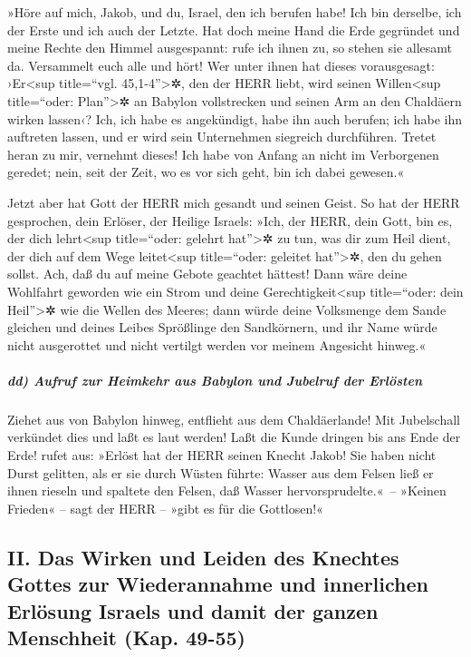 »Höre auf mich, Jakob, und du, Israel, den ich berufen
habe! Ich bin derselbe, ich der Erste und ich auch der Letzte.
Hat doch meine Hand die Erde gegründet und meine Rechte
den Himmel ausgespannt: rufe ich ihnen zu, so stehen sie allesamt da.
Versammelt euch alle und hört! Wer unter ihnen hat dieses
vorausgesagt: ›Er\textless sup title=``vgl. 45,1-4''\textgreater✲, den
der HERR liebt, wird seinen Willen\textless sup title=``oder:
Plan''\textgreater✲ an Babylon vollstrecken und seinen Arm an den
Chaldäern wirken lassen‹? Ich, ich habe es angekündigt,
habe ihn auch berufen; ich habe ihn auftreten lassen, und er wird sein
Unternehmen siegreich durchführen. Tretet heran zu mir,
vernehmt dieses! Ich habe von Anfang an nicht im Verborgenen geredet;
nein, seit der Zeit, wo es vor sich geht, bin ich dabei gewesen.«

Jetzt aber hat Gott der HERR mich gesandt und seinen Geist.
So hat der HERR gesprochen, dein Erlöser, der Heilige
Israels: »Ich, der HERR, dein Gott, bin es, der dich lehrt\textless sup
title=``oder: gelehrt hat''\textgreater✲ zu tun, was dir zum Heil dient,
der dich auf dem Wege leitet\textless sup title=``oder: geleitet
hat''\textgreater✲, den du gehen sollst. Ach, daß du auf
meine Gebote geachtet hättest! Dann wäre deine Wohlfahrt geworden wie
ein Strom und deine Gerechtigkeit\textless sup title=``oder: dein
Heil''\textgreater✲ wie die Wellen des Meeres; dann würde
deine Volksmenge dem Sande gleichen und deines Leibes Sprößlinge den
Sandkörnern, und ihr Name würde nicht ausgerottet und nicht vertilgt
werden vor meinem Angesicht hinweg.«

\hypertarget{dd-aufruf-zur-heimkehr-aus-babylon-und-jubelruf-der-erluxf6sten}{%
\subparagraph{dd) Aufruf zur Heimkehr aus Babylon und Jubelruf der
Erlösten}\label{dd-aufruf-zur-heimkehr-aus-babylon-und-jubelruf-der-erluxf6sten}}

Ziehet aus von Babylon hinweg, entflieht aus dem
Chaldäerlande! Mit Jubelschall verkündet dies und laßt es laut werden!
Laßt die Kunde dringen bis ans Ende der Erde! rufet aus: »Erlöst hat der
HERR seinen Knecht Jakob! Sie haben nicht Durst gelitten,
als er sie durch Wüsten führte: Wasser aus dem Felsen ließ er ihnen
rieseln und spaltete den Felsen, daß Wasser hervorsprudelte.«~--
»Keinen Frieden« -- sagt der HERR -- »gibt es für die
Gottlosen!«

\hypertarget{ii.-das-wirken-und-leiden-des-knechtes-gottes-zur-wiederannahme-und-innerlichen-erluxf6sung-israels-und-damit-der-ganzen-menschheit-kap.-49-55}{%
\subsection{II. Das Wirken und Leiden des Knechtes Gottes zur
Wiederannahme und innerlichen Erlösung Israels und damit der ganzen
Menschheit (Kap.
49-55)}\label{ii.-das-wirken-und-leiden-des-knechtes-gottes-zur-wiederannahme-und-innerlichen-erluxf6sung-israels-und-damit-der-ganzen-menschheit-kap.-49-55}}

